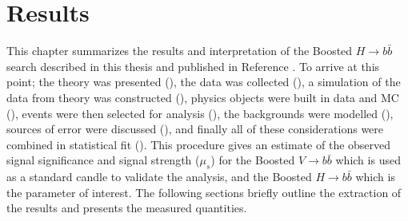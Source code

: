 \chapter{Results} \label{chap:results}

This chapter summarizes the results and interpretation of the Boosted $H
\rightarrow b\bar{b}$ search described in this thesis and published in
Reference \cite{ATLAS-CONF-2018-052}.  To arrive at this point; the theory was
presented (), the data was collected
(), a simulation of the data from theory was
constructed (), physics objects were built in data and MC
(), events were then selected for analysis
(), the backgrounds were modelled
(), sources of error were discussed
(), and finally all of these considerations were
combined in statistical fit (). This procedure gives an estimate
of the observed signal significance and signal strength ($\mu_{s}$) for the
Boosted $V \rightarrow b\bar{b}$ which is used as a standard candle to validate
the analysis, and the Boosted $H \rightarrow b\bar{b}$ which is the parameter
of interest. The following sections briefly outline the extraction of the
results and presents the measured quantities.




